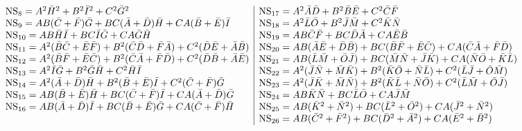 \begin{equation*}
  \begin{array}{l|l}
{\rm NS}_8 = A^2 \bar{H}^2 +B^2 \bar{I}^2 +C^2 \bar{G}^2 
& {\rm NS}_{17} = A^2 \bar{A}\bar{D} +B^2 \bar{B}\bar{E} +C^2 \bar{C}\bar{F}\\
{\rm NS}_9 = AB (\bar{C}+\bar{F})\bar{G} +BC (\bar{A}+\bar{D})\bar{H} + CA
 (\bar{B}+\bar{E})\bar{I} 
& {\rm NS}_{18} = A^2 \bar{L}\bar{O} +B^2 \bar{J}\bar{M} +C^2 \bar{K}\bar{N}\\ 
{\rm NS}_{10} = AB \bar{H}\bar{I} +BC \bar{I}\bar{G} +CA \bar{G}\bar{H}
& {\rm NS}_{19} =  AB \bar{C}\bar{F} +BC \bar{D}\bar{A} +CA \bar{E}\bar{B} \\
{\rm NS}_{11} = A^2 (\bar{B}\bar{C} +\bar{E}\bar{F}) +B^2(\bar{C}\bar{D}
 +\bar{F}\bar{A}) +C^2(\bar{D}\bar{E} +\bar{A}\bar{B})
& {\rm NS}_{20} = AB (\bar{A}\bar{E}+\bar{D}\bar{B}) +BC(\bar{B}\bar{F}+\bar{E}\bar{C}) +CA(\bar{C}\bar{A}+\bar{F}\bar{D}) \\
{\rm NS}_{12} =  A^2 (\bar{B}\bar{F} +\bar{E}\bar{C}) +B^2(\bar{C}\bar{A}
 +\bar{F}\bar{D}) +C^2(\bar{D}\bar{B} +\bar{A}\bar{E})
& {\rm NS}_{21} = AB (\bar{L}\bar{M}+\bar{O}\bar{J})
+BC(\bar{M}\bar{N}+\bar{J}\bar{K}) +CA(\bar{N}\bar{O}+\bar{K}\bar{L}) \\
{\rm NS}_{13} = A^2 \bar{I}\bar{G} +B^2 \bar{G}\bar{H} +C^2 \bar{H}\bar{I}
& {\rm NS}_{22} =  A^2 (\bar{J}\bar{N} +\bar{M}\bar{K}) +B^2(\bar{K}\bar{O} +\bar{N}\bar{L}) +C^2(\bar{L}\bar{J} +\bar{O}\bar{M})  \\
{\rm NS}_{14} = A^2 (\bar{A} +\bar{D})\bar{H} +B^2 (\bar{B} +\bar{E})\bar{I} +C^2 (\bar{C} +\bar{F})\bar{G}
& {\rm NS}_{23} = A^2 (\bar{J}\bar{K} +\bar{M}\bar{N}) +B^2(\bar{K}\bar{L} +\bar{N}\bar{O}) +C^2(\bar{L}\bar{M} +\bar{O}\bar{J}) \\
{\rm NS}_{15} = AB (\bar{B}+\bar{E})\bar{H} +BC
(\bar{C}+\bar{F})\bar{I} +CA (\bar{A}+\bar{D})\bar{G}
& {\rm NS}_{24} = AB \bar{K}\bar{N} +BC \bar{L}\bar{O} +CA \bar{J}\bar{M} \\
{\rm NS}_{16} = AB (\bar{A}+\bar{D})\bar{I} +BC (\bar{B}+\bar{E})\bar{G} +CA (\bar{C}+\bar{F})\bar{H}
& {\rm NS}_{25} = AB (\bar{K}^2+\bar{N}^2) +BC (\bar{L}^2+\bar{O}^2) + CA
 (\bar{J}^2+\bar{N}^2) \\
& {\rm NS}_{26} = AB (\bar{C}^2+\bar{F}^2) +BC (\bar{D}^2+\bar{A}^2) + CA
 (\bar{E}^2+\bar{B}^2)
  \end{array}
\end{equation*}

